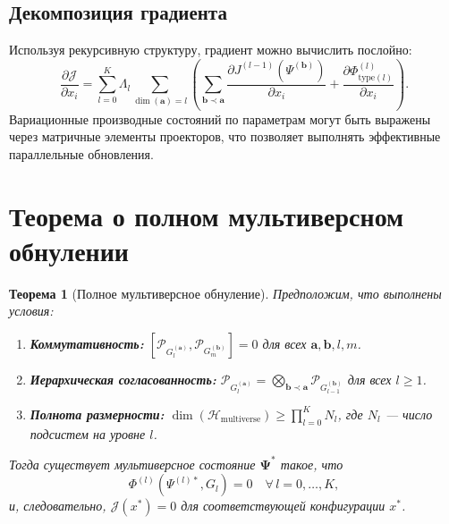 \documentclass[12pt,a4paper]{article}
\newtheorem{theorem}{Теорема}[section]
\newcommand{\pG}{\mathcal{P}_{G}}
\newcommand{\JJ}{\mathcal{J}}
\newcommand{\HH}{\mathcal{H}}
\begin{document}
\subsection{Декомпозиция градиента}
Используя рекурсивную структуру, градиент можно вычислить послойно:
\begin{equation}\label{eq:graddecomp}
\frac{\partial \JJ}{\partial x_i} = \sum_{l=0}^K \Lambda_l \sum_{\dim(\mathbf{a})=l}
\left( \sum_{\mathbf{b}\prec\mathbf{a}} \frac{\partial J^{(l-1)}(\Psi^{(\mathbf{b})})}{\partial x_i} + \frac{\partial \Phi^{(l)}_{\text{type}(l)}}{\partial x_i} \right).
\end{equation}
Вариационные производные состояний по параметрам могут быть выражены через матричные элементы проекторов, что позволяет выполнять эффективные параллельные обновления.

\section{Теорема о полном мультиверсном обнулении}

\begin{theorem}[Полное мультиверсное обнуление]\label{thm:null}
Предположим, что выполнены условия:
\begin{enumerate}
\item[(i)] \textbf{Коммутативность:} $[\pG_l^{(\mathbf{a})}, \pG_m^{(\mathbf{b})}] = 0$ для всех $\mathbf{a},\mathbf{b},l,m$.
\item[(ii)] \textbf{Иерархическая согласованность:} $\pG_l^{(\mathbf{a})} = \bigotimes_{\mathbf{b}\prec\mathbf{a}} \pG_{l-1}^{(\mathbf{b})}$ для всех $l\ge 1$.
\item[(iii)] \textbf{Полнота размерности:} $\dim(\HH_{\text{multiverse}}) \ge \prod_{l=0}^K N_l$, где $N_l$ — число подсистем на уровне $l$.
\end{enumerate}
Тогда существует мультиверсное состояние $\mathbf{\Psi}^*$ такое, что
\[
\Phi^{(l)}(\Psi^{(l)*}, G_l) = 0 \quad \forall\, l=0,\dots,K,
\]
и, следовательно, $\JJ(x^*) = 0$ для соответствующей конфигурации $x^*$.
\end{theorem}
\end{document}
